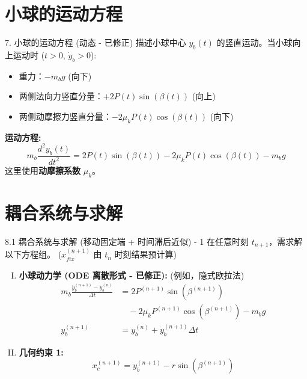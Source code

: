 \documentclass{beamer}
\begin{document}
\section{小球的运动方程}
\begin{frame}{7. 小球的运动方程 (动态 - 已修正)}
    描述小球中心 $y_b(t)$ 的竖直运动。当小球向上运动时 ($t>0$, $\dot{y}_b > 0$):
    \begin{itemize}
        \item 重力：$-m_b g$ (向下)
        \item 两侧法向力竖直分量：$+2 P(t) \sin(\beta(t))$ (向上)
        \item 两侧动摩擦力竖直分量：$-2 \mu_k P(t) \cos(\beta(t))$ (向下)
    \end{itemize}
    \textbf{运动方程:}
    \begin{equation*}
        \boxed{m_b \frac{d^2 y_b(t)}{dt^2} = 2 P(t) \sin(\beta(t)) - 2 \mu_k P(t) \cos(\beta(t)) - m_b g}
    \end{equation*}
    这里使用\textbf{动摩擦系数} $\mu_k$。
\end{frame}

\section{耦合系统与求解}
\begin{frame}{8.1 耦合系统与求解 (移动固定端 + 时间滞后近似) - 1}
    在任意时刻 $t_{n+1}$，需求解以下方程组。 ($x_{fix}^{(n+1)}$ 由 $t_n$ 时刻结果预计算)

    \begin{enumerate}[(I)]
        \item \textbf{小球动力学 (ODE 离散形式 - 已修正):} (例如，隐式欧拉法)
            \begin{align*}
                m_b \frac{\dot{y}_b^{(n+1)} - \dot{y}_b^{(n)}}{\Delta t} &= 2 P^{(n+1)} \sin(\beta^{(n+1)}) \\
                                               &\quad - 2 \mu_k P^{(n+1)} \cos(\beta^{(n+1)}) - m_b g \\
                y_b^{(n+1)} &= y_b^{(n)} + \dot{y}_b^{(n+1)} \Delta t
            \end{align*}
        \item \textbf{几何约束 1:}
            \begin{equation*}
                 x_c^{(n+1)} = y_b^{(n+1)} - r \sin(\beta^{(n+1)})
            \end{equation*}
    \end{enumerate}
\end{frame}
\end{document}
